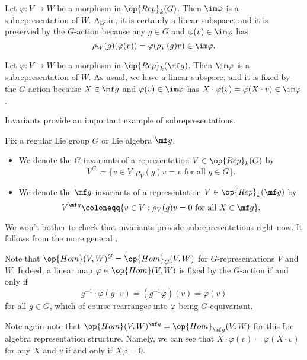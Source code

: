 \documentclass[../notes.tex]{subfiles}
\begin{document}
\begin{example} \label{ex:image-subrep}
	Let $\varphi\colon V\to W$ be a morphism in $\op{Rep}_k(G)$. Then $\im\varphi$ is a subrepresentation of $W$. Again, it is certainly a linear subspace, and it is preserved by the $G$-action because any $g\in G$ and $\varphi(v)\in\im\varphi$ has
	\[\rho_W(g)(\varphi(v))=\varphi(\rho_V(g)v)\in\im\varphi.\]
\end{example}
\begin{example}
	Let $\varphi\colon V\to W$ be a morphism in $\op{Rep}_k(\mf g)$. Then $\im\varphi$ is a subrepresentation of $W$. As usual, we have a linear subspace, and it is fixed by the $G$-action because $X\in\mf g$ and $\varphi(v)\in\im\varphi$ has $X\cdot\varphi(v)=\varphi(X\cdot v)\in\im\varphi$.
\end{example}
Invariants provide an important example of subrepresentations.
\begin{definition}[invariants]
	Fix a regular Lie group $G$ or Lie algebra $\mf g$.
	\begin{itemize}
		\item We denote the $G$-invariants of a representation $V\in\op{Rep}_k(G)$ by
		\[V^G\coloneqq\{v\in V:\rho_V(g)v=v\text{ for all }g\in G\}.\]
		\item We denote the $\mf g$-invariants of a representation $V\in\op{Rep}_k(\mf g)$ by
		\[V^{\mf g}\coloneqq\{v\in V:\rho_V(g)v=0\text{ for all }X\in\mf g\}.\]
	\end{itemize}
\end{definition}
\begin{remark}
	We won't bother to check that invariants provide subrepresentations right now. It follows from the more general .
\end{remark}
\begin{example}
	Note that $\op{Hom}(V,W)^G=\op{Hom}_G(V,W)$ for $G$-representations $V$ and $W$. Indeed, a linear map $\varphi\in\op{Hom}(V,W)$ is fixed by the $G$-action if and only if
	\[g^{-1}\cdot\varphi(g\cdot v)=\left(g^{-1}\varphi\right)(v)=\varphi(v)\]
	for all $g\in G$, which of course rearranges into $\varphi$ being $G$-equivariant.
\end{example}
\begin{example}
	Note again note that $\op{Hom}(V,W)^{\mf g}=\op{Hom}_{\mf g}(V,W)$ for this Lie algebra representation structure. Namely, we can see that $X\cdot\varphi(v)=\varphi(X\cdot v)$ for any $X$ and $v$ if and only if $X\varphi=0$.
\end{example}
\end{document}
